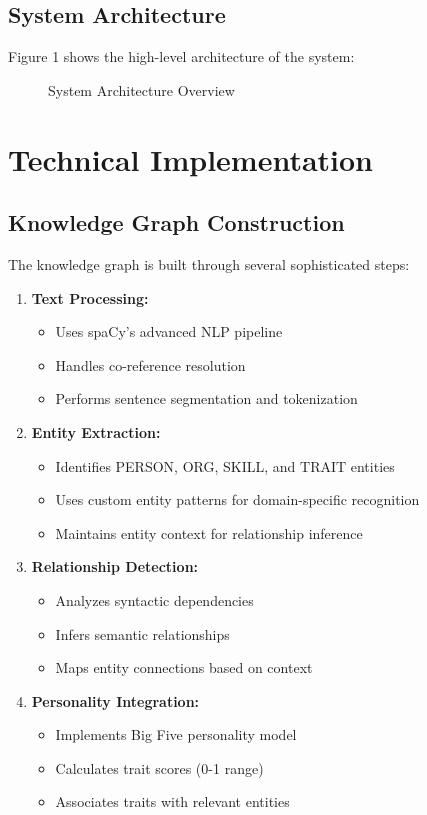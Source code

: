 \documentclass[11pt]{article}
\begin{document}
\subsection{System Architecture}
Figure 1 shows the high-level architecture of the system:

\begin{figure}[H]
    \centering
    
    \caption{System Architecture Overview}
    \label{fig:architecture}
\end{figure}

\section{Technical Implementation}

\subsection{Knowledge Graph Construction}
The knowledge graph is built through several sophisticated steps:

\begin{enumerate}[label=\textbf{\arabic*.}, itemsep=0.5em]
    \item \textbf{Text Processing:}
    \begin{itemize}
        \item Uses spaCy's advanced NLP pipeline
        \item Handles co-reference resolution
        \item Performs sentence segmentation and tokenization
    \end{itemize}
    
    \item \textbf{Entity Extraction:}
    \begin{itemize}
        \item Identifies PERSON, ORG, SKILL, and TRAIT entities
        \item Uses custom entity patterns for domain-specific recognition
        \item Maintains entity context for relationship inference
    \end{itemize}
    
    \item \textbf{Relationship Detection:}
    \begin{itemize}
        \item Analyzes syntactic dependencies
        \item Infers semantic relationships
        \item Maps entity connections based on context
    \end{itemize}
    
    \item \textbf{Personality Integration:}
    \begin{itemize}
        \item Implements Big Five personality model
        \item Calculates trait scores (0-1 range)
        \item Associates traits with relevant entities
    \end{itemize}
\end{enumerate}
\end{document}

